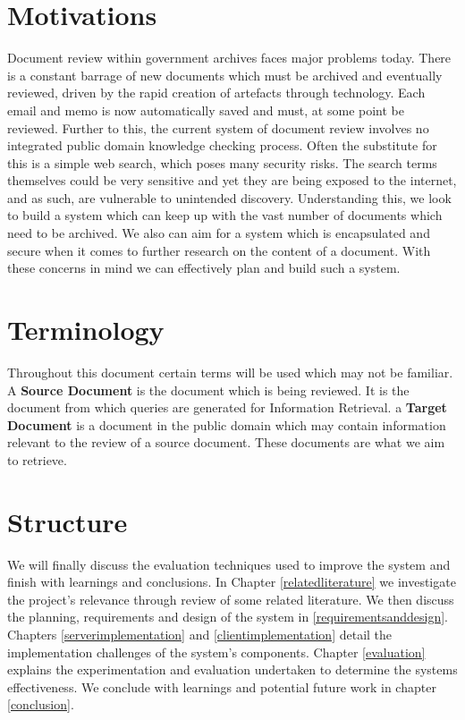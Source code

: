 \documentclass{l4proj}
\begin{document}
\section{Motivations}
Document review within government archives faces major problems today. There is a constant barrage of new documents which must be archived and eventually reviewed, driven by the rapid creation of artefacts through technology. Each email and memo is now automatically saved and must, at some point be reviewed.
Further to this, the current system of document review involves no integrated public domain knowledge checking process. Often the substitute for this is a simple web search, which poses many security risks. The search terms themselves could be very sensitive and yet they are being exposed to the internet, and as such, are vulnerable to unintended discovery.
Understanding this, we look to build a system which can keep up with the vast number of documents which need to be archived. We also can aim for a system which is encapsulated and secure when it comes to further research on the content of a document.
With these concerns in mind we can effectively plan and build such a system.

\section{Terminology}
Throughout this document certain terms will be used which may not be familiar.
A \textbf{Source Document} is the document which is being reviewed. It is the document from which queries are generated for Information Retrieval.
a \textbf{Target Document} is a document in the public domain which may contain information relevant to the review of a source document. These documents are what we aim to retrieve.

\section{Structure}
We will finally discuss the evaluation techniques used to improve the system and finish with learnings and conclusions.
In Chapter \ref{relatedliterature} we investigate the project's relevance through review of some related literature. We then discuss the planning, requirements and design of the system in \ref{requirementsanddesign}. Chapters \ref{serverimplementation} and \ref{clientimplementation} detail the implementation challenges of the system's components. Chapter \ref{evaluation} explains the experimentation and evaluation undertaken to determine the systems effectiveness. We conclude with learnings and potential future work in chapter \ref{conclusion}.
\end{document}
